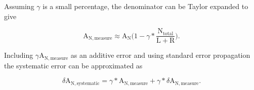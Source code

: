 Assuming $\gamma$ is a small percentage, the denominator can be Taylor expanded
to give

\begin{equation}
  \mathrm{A}_{\mathrm{N,measure}} \approx
  \mathrm{A}_{\mathrm{N}}
  \Big (1-\gamma*\frac{\mathrm{N}_{\mathrm{total}}}{\mathrm{L}+\mathrm{R}}\Big).
\end{equation}

\noindent
Including $\gamma$A$_{\mathrm{N,measure}}$ as an additive error and using
standard error propagation the systematic error can be approximated as

\begin{equation}
  \delta \mathrm{A}_{\mathrm{N,systematic}} =
  \gamma *\mathrm{A}_{\mathrm{N,measure}} +
  \gamma *\delta \mathrm{A}_{\mathrm{N,measure}}.
\end{equation}



